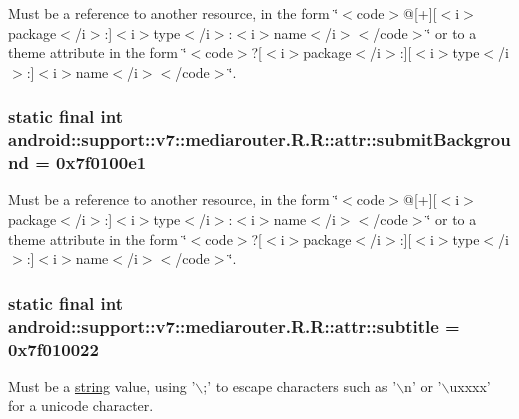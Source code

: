 Must be a reference to another resource, in the form \char`\"{}$<$code$>$@\mbox{[}+\mbox{]}\mbox{[}$<$i$>$package$<$/i$>$:\mbox{]}$<$i$>$type$<$/i$>$:$<$i$>$name$<$/i$>$$<$/code$>$\char`\"{} or to a theme attribute in the form \char`\"{}$<$code$>$?\mbox{[}$<$i$>$package$<$/i$>$:\mbox{]}\mbox{[}$<$i$>$type$<$/i$>$:\mbox{]}$<$i$>$name$<$/i$>$$<$/code$>$\char`\"{}. \hypertarget{classandroid_1_1support_1_1v7_1_1mediarouter_1_1_r_1_1attr_154b380ac5e4382a2027a5bc4029291b}{
\subsubsection[{submitBackground}]{\setlength{\rightskip}{0pt plus 5cm}static final int android::support::v7::mediarouter.R.R::attr::submitBackground = 0x7f0100e1}}
\label{classandroid_1_1support_1_1v7_1_1mediarouter_1_1_r_1_1attr_154b380ac5e4382a2027a5bc4029291b}


Must be a reference to another resource, in the form \char`\"{}$<$code$>$@\mbox{[}+\mbox{]}\mbox{[}$<$i$>$package$<$/i$>$:\mbox{]}$<$i$>$type$<$/i$>$:$<$i$>$name$<$/i$>$$<$/code$>$\char`\"{} or to a theme attribute in the form \char`\"{}$<$code$>$?\mbox{[}$<$i$>$package$<$/i$>$:\mbox{]}\mbox{[}$<$i$>$type$<$/i$>$:\mbox{]}$<$i$>$name$<$/i$>$$<$/code$>$\char`\"{}. \hypertarget{classandroid_1_1support_1_1v7_1_1mediarouter_1_1_r_1_1attr_4404ab1276486a31095491bdcf0ed279}{
\subsubsection[{subtitle}]{\setlength{\rightskip}{0pt plus 5cm}static final int android::support::v7::mediarouter.R.R::attr::subtitle = 0x7f010022}}
\label{classandroid_1_1support_1_1v7_1_1mediarouter_1_1_r_1_1attr_4404ab1276486a31095491bdcf0ed279}


Must be a \hyperlink{classandroid_1_1support_1_1v7_1_1mediarouter_1_1_r_1_1string}{string} value, using '$\backslash$;' to escape characters such as '$\backslash$n' or '$\backslash$uxxxx' for a unicode character. 

